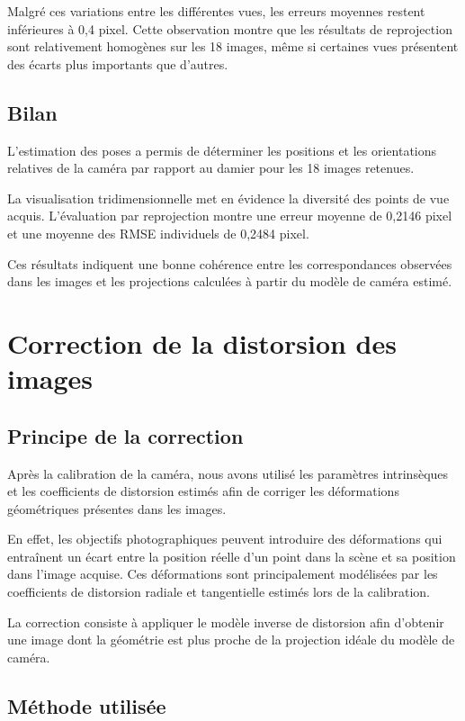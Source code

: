 \documentclass[12pt,a4paper]{report}
\begin{document}
Malgré ces variations entre les différentes vues, les erreurs
moyennes restent inférieures à 0,4 pixel. Cette observation
montre que les résultats de reprojection sont relativement
homogènes sur les 18 images, même si certaines vues présentent
des écarts plus importants que d'autres.

\section{Bilan}

L'estimation des poses a permis de déterminer les positions et
les orientations relatives de la caméra par rapport au damier
pour les 18 images retenues.

La visualisation tridimensionnelle met en évidence la diversité
des points de vue acquis. L'évaluation par reprojection montre
une erreur moyenne de 0,2146 pixel et une moyenne des RMSE
individuels de 0,2484 pixel.

Ces résultats indiquent une bonne cohérence entre les
correspondances observées dans les images et les projections
calculées à partir du modèle de caméra estimé.

\chapter{Correction de la distorsion des images}

\section{Principe de la correction}

Après la calibration de la caméra, nous avons utilisé les paramètres
intrinsèques et les coefficients de distorsion estimés afin de
corriger les déformations géométriques présentes dans les images.

En effet, les objectifs photographiques peuvent introduire des
déformations qui entraînent un écart entre la position réelle d'un
point dans la scène et sa position dans l'image acquise. Ces
déformations sont principalement modélisées par les coefficients
de distorsion radiale et tangentielle estimés lors de la calibration.

La correction consiste à appliquer le modèle inverse de distorsion
afin d'obtenir une image dont la géométrie est plus proche de la
projection idéale du modèle de caméra.

\section{Méthode utilisée}
\end{document}
